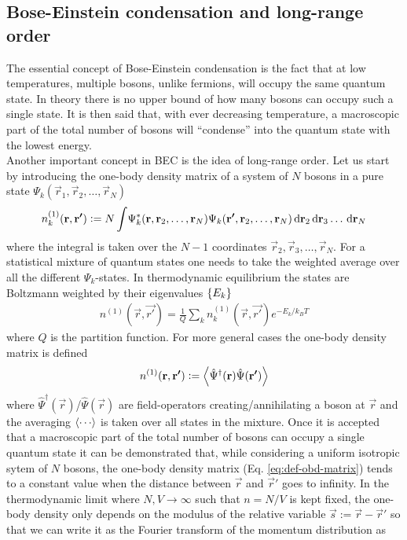 		\subsection{Bose-Einstein condensation and long-range order}
			The essential concept of Bose-Einstein condensation is the fact that at low temperatures, multiple bosons, unlike fermions, will occupy the same quantum state. In theory there is no upper bound of how many bosons can occupy such a single state. It is then said that, with ever decreasing temperature, a macroscopic part of the total number of bosons will ``condense'' into the quantum state with the lowest energy.\\			
			
			Another important concept in BEC is the idea of long-range order. Let us start by introducing the one-body density matrix of a system of $N$ bosons in a pure state $\Psi_k(\vec{r}_1,\vec{r}_2,\ldots,\vec{r}_N)$
			\begin{align}
				n^{(1)}_k(\bm{\mathrm{r}},\bm{\mathrm{r'}}) \vcentcolon= N\int\!	\Psi_k^*(\bm{\mathrm{r}},\bm{\mathrm{r}}_2,\ldots,\bm{\mathrm{r}}_N)\Psi_k(\bm{\mathrm{r'}},\bm{\mathrm{r}}_2,\ldots,\bm{\mathrm{r}}_N)\,\mathrm{d}{\bm{\mathrm{r}}}_2\,\mathrm{d}{\bm{\mathrm{r}}}_3\ldots\,\mathrm{d}{\bm{\mathrm{r}}}_N	\label{eq:def-obd-matrix}
			\end{align}
			where the integral is taken over the $N-1$ coordinates $\vec{r}_2,\vec{r}_3,\ldots,\vec{r}_N$. For a statistical mixture of quantum states one needs to take the weighted average over all the different $\Psi_k$-states. In thermodynamic equilibrium the states are Boltzmann weighted by their eigenvalues $\qty{E_k}$
			\begin{align}
				n^{(1)}(\vec{r},\vec{r'}) = \frac{1}{Q}\sum_k n^{(1)}_k(\vec{r},\vec{r'}) \unit{e}^{-E_k/k_BT}
			\end{align}
			where $Q$ is the partition function. For more general cases the one-body density matrix is defined
			\begin{align}
				n^{(1)}(\bm{\mathrm{r}},\bm{\mathrm{r'}}) \vcentcolon=\expval{\hat\Psi^\dagger(\bm{\mathrm{r}})\hat\Psi(\bm{\mathrm{r'}})}
			\end{align}
			where $\hat\Psi^\dagger(\vec{r})$/$\hat\Psi(\vec{r})$ are field-operators creating/annihilating a boson at $\vec{r}$ and the averaging $\expval{\cdots}$ is taken over all states in the mixture. Once it is accepted that a macroscopic part of the total number of bosons can occupy a single quantum state it can be demonstrated that, while considering a uniform isotropic sytem of $N$ bosons, the one-body density matrix (Eq. \ref{eq:def-obd-matrix}) tends to a constant value when the distance between $\vec{r}$ and $\vec{r}'$ goes to infinity. In the thermodynamic limit where $N,V\rightarrow\infty$ such that $n=N/V$ is kept fixed, the one-body density only depends on the modulus of the relative variable $\vec{s}:=\vec{r}-\vec{r}'$ so that we can write it as the Fourier transform of the momentum distribution as
